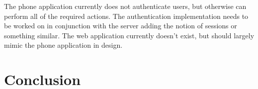 \documentclass{article}
\begin{document}
The phone application currently does not authenticate users, but otherwise can perform all of the required actions.
The authentication implementation needs to be worked on in conjunction with the server adding the notion of sessions or
something similar. The web application currently doesn't exist, but should largely mimic the phone application in
design.

\section{Conclusion}
\end{document}
